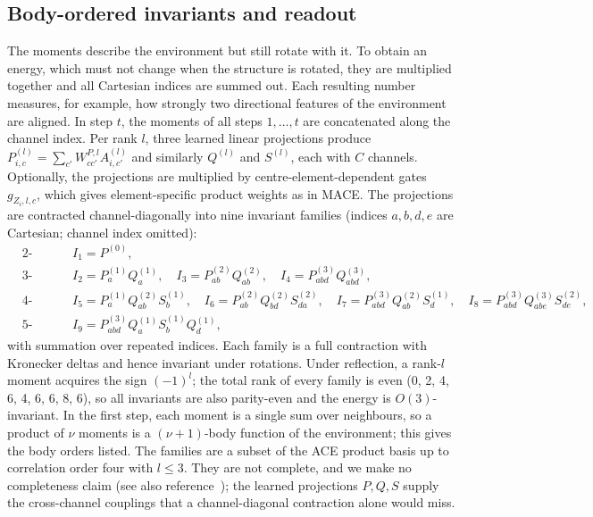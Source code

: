 \documentclass[journal=jctcce,manuscript=article,layout=traditional]{achemso}
\begin{document}
\subsection{Body-ordered invariants and readout}
\label{sec:invariants}
The moments describe the environment but still rotate with it. To obtain an energy, which must not change when the
structure is rotated, they are multiplied together and all Cartesian indices are summed out. Each resulting number
measures, for example, how strongly two directional features of the environment are aligned. In step $t$, the
moments of all steps $1,\dots,t$ are concatenated along the channel index. Per rank $l$, three
learned linear projections produce $P^{(l)}_{i,c}=\sum_{c'}W^{P,l}_{cc'}A^{(l)}_{i,c'}$ and similarly $Q^{(l)}$
and $S^{(l)}$, each with $C$ channels. Optionally, the projections are multiplied by centre-element-dependent gates
$g_{Z_i,l,c}$, which gives element-specific product weights as in MACE. The projections are contracted
channel-diagonally into nine invariant families (indices $a,b,d,e$ are Cartesian; channel index omitted):
\begin{align}
&\text{2-body:} && I_1=P^{(0)},\nonumber\\
&\text{3-body:} && I_2=P^{(1)}_aQ^{(1)}_a,\quad I_3=P^{(2)}_{ab}Q^{(2)}_{ab},\quad I_4=P^{(3)}_{abd}Q^{(3)}_{abd},\nonumber\\
&\text{4-body:} && I_5=P^{(1)}_aQ^{(2)}_{ab}S^{(1)}_b,\quad I_6=P^{(2)}_{ab}Q^{(2)}_{bd}S^{(2)}_{da},\quad
I_7=P^{(3)}_{abd}Q^{(2)}_{ab}S^{(1)}_d,\quad I_8=P^{(3)}_{abd}Q^{(3)}_{abe}S^{(2)}_{de},\nonumber\\
&\text{5-body:} && I_9=P^{(3)}_{abd}Q^{(1)}_aS^{(1)}_bQ^{(1)}_d,
\label{eq:invariants}
\end{align}
with summation over repeated indices. Each family is a full contraction with Kronecker deltas and hence invariant
under rotations. Under reflection, a rank-$l$ moment acquires the sign $(-1)^l$; the total rank of every family is
even (0, 2, 4, 6, 4, 6, 6, 8, 6), so all invariants are also parity-even and the energy is $O(3)$-invariant. In the
first step, each moment is a single sum over neighbours, so a product of $\nu$ moments is a $(\nu+1)$-body function
of the environment; this gives the body orders listed. The families are a subset of the ACE product basis up to
correlation order four with $l\le3$. They are not complete, and we make no completeness claim (see also
reference~); the learned projections $P,Q,S$ supply the cross-channel couplings that a
channel-diagonal contraction alone would miss.
\end{document}
